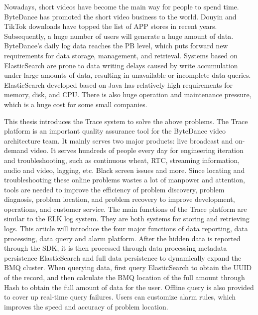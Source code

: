 \documentclass[winfonts,master,twoside]{njuthesis}
\begin{document}
\begin{englishabstract}
Nowadays, short videos have become the main way for people to spend time. ByteDance has promoted the short video business to the world. Douyin and TikTok downloads have topped the list of APP stores in recent years. Subsequently, a huge number of users will generate a huge amount of data. ByteDance's daily log data reaches the PB level, which puts forward new requirements for data storage, management, and retrieval. Systems based on ElasticSearch are prone to data writing delays caused by write accumulation under large amounts of data, resulting in unavailable or incomplete data queries. ElasticSearch developed based on Java has relatively high requirements for memory, disk, and CPU. There is also huge operation and maintenance pressure, which is a huge cost for some small companies.
 
This thesis introduces the Trace system to solve the above problems. The Trace platform is an important quality assurance tool for the ByteDance video architecture team. It mainly serves two major products: live broadcast and on-demand video. It serves hundreds of people every day for engineering iteration and troubleshooting, such as continuous wheat, RTC, streaming information, audio and video, lagging, etc. Black screen issues and more. Since locating and troubleshooting these online problems wastes a lot of manpower and attention, tools are needed to improve the efficiency of problem discovery, problem diagnosis, problem location, and problem recovery to improve development, operations, and customer service. The main functions of the Trace platform are similar to the ELK log system. They are both systems for storing and retrieving logs. This article will introduce the four major functions of data reporting, data processing, data query and alarm platform.
After the hidden data is reported through the SDK, it is then processed through data processing metadata persistence ElasticSearch and full data persistence to dynamically expand the BMQ cluster. When querying data, first query ElasticSearch to obtain the UUID of the record, and then calculate the BMQ location of the full amount through Hash to obtain the full amount of data for the user. Offline query is also provided to cover up real-time query failures. Users can customize alarm rules, which improves the speed and accuracy of problem location.


\end{englishabstract}
\end{document}
